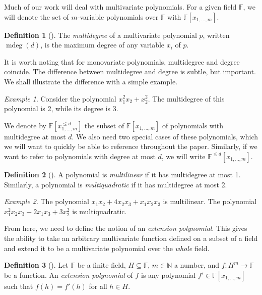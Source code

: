 \documentclass[english,12pt]{reedthesis}
\theoremstyle{plain}
\theoremstyle{definition}
\newtheorem{defn}[defn]{Definition}
\theoremstyle{remark}
\newtheorem{example}{Example}[thm]
\DeclareMathOperator{\mdeg}{mdeg}
\begin{document}
Much of our work will deal with multivariate polynomials. For a given field
$\mathbb{F}$, we will denote the set of $m$-variable polynomials over
$\mathbb{F}$ with $\mathbb{F}[x_{1, \ldots, m}]$.

\begin{defn}[{\cite[8]{AW09}}]\label{def:mdeg}
  The \emph{multidegree} of a multivariate polynomial $p$, written $\mdeg(d)$,
  is the maximum degree of any variable $x_{i}$ of $p$.
\end{defn}

It is worth noting that for monovariate polynomials, multidegree and degree
coincide. The difference between multidegree and degree is subtle, but
important. We shall illustrate the difference with a simple example.

\begin{example}
  Consider the polynomial $x_{1}^{2}x_{2} + x_{2}^{2}$. The multidegree of this
  polynomial is 2, while its degree is 3.
\end{example}

We denote by $\mathbb{F}[x_{1, \ldots, m}^{\le d}]$ the subset of
$\mathbb{F}[x_{1, \ldots, m}]$ of polynomials with multidegree at most $d$. We also
need two special cases of these polynomials, which we will want to quickly be
able to reference throughout the paper. Similarly, if we want to refer to
polynomials with degree at most $d$, we will write $\mathbb{F}^{\le d}[x_{1, \ldots, m}]$.

\begin{defn}[{\cite[8]{AW09}}]\label{def:mlin}
  A polynomial is \emph{multilinear} if it has multidegree at most 1. Similarly,
  a polynomial is \emph{multiquadratic} if it has multidegree at most 2.
\end{defn}

\begin{example}
  The polynomial $x_{1}x_{2} + 4x_{2}x_{3} + x_{1}x_{2}x_{3}$ is multilinear. The
  polynomial $x_{1}^{2}x_{2}x_{3} - 2x_{1}x_{3} + 3x_{2}^{2}$ is multiquadratic.
\end{example}

From here, we need to define the notion of an \emph{extension polynomial}. This
gives the ability to take an arbitrary multivariate function defined on a subset
of a field and extend it to be a multivariate polynomial over the \emph{whole}
field.

\begin{defn}[{\cite[8]{AW09}}]\label{def:ext-poly}
  Let $\mathbb{F}$ be a finite field, $H \subseteq \mathbb{F}$, $m \in \mathbb{N}$ a number, and
  $f\colon H^{m} \rightarrow \mathbb{F}$ be a function. An \emph{extension polynomial} of
  $f$ is any polynomial $f' \in \mathbb{F}[x_{1, \ldots, m}]$ such that $f(h) = f'(h)$
  for all $h \in H$.
\end{defn}
\end{document}

